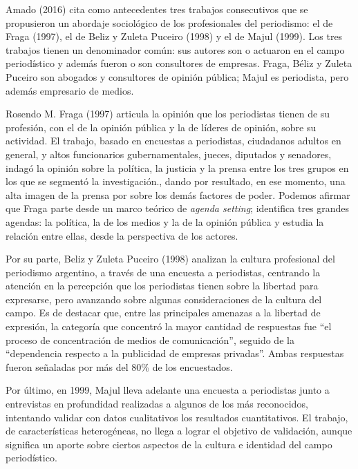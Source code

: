 Amado (2016) cita como antecedentes tres trabajos consecutivos que se propusieron un abordaje sociológico de los profesionales del periodismo: el de Fraga (1997), el de Beliz y Zuleta Puceiro (1998) y el de Majul (1999). Los tres trabajos tienen un denominador común: sus autores son o actuaron en el campo periodístico y además fueron o son consultores de empresas. Fraga, Béliz y Zuleta Puceiro son abogados y consultores de opinión pública; Majul es periodista, pero además empresario de medios.

Rosendo M. Fraga (1997) articula la opinión que los periodistas tienen de su profesión, con el de la opinión pública y la de líderes de opinión, sobre su actividad. El trabajo, basado en encuestas a periodistas, ciudadanos adultos en general, y altos funcionarios gubernamentales, jueces, diputados y senadores, indagó la opinión sobre la política, la justicia y la prensa entre los tres grupos en los que se segmentó la investigación., dando por resultado, en ese momento, una alta imagen de la prensa por sobre los demás factores de poder. Podemos afirmar que Fraga parte desde un marco teórico de \emph{agenda setting}; identifica tres grandes agendas: la política, la de los medios y la de la opinión pública y estudia la relación entre ellas, desde la perspectiva de los actores.

Por su parte, Beliz y Zuleta Puceiro (1998) analizan la cultura profesional del periodismo argentino, a través de una encuesta a periodistas, centrando la atención en la percepción que los periodistas tienen sobre la libertad para expresarse, pero avanzando sobre algunas consideraciones de la cultura del campo. Es de destacar que, entre las principales amenazas a la libertad de expresión, la categoría que concentró la mayor cantidad de respuestas fue \enquote{el proceso de concentración de medios de comunicación}, seguido de la \enquote{dependencia respecto a la publicidad de empresas privadas}. Ambas respuestas fueron señaladas por más del 80\% de los encuestados.

Por último, en 1999, Majul lleva adelante una encuesta a periodistas junto a entrevistas en profundidad realizadas a algunos de los más reconocidos, intentando validar con datos cualitativos los resultados cuantitativos. El trabajo, de características heterogéneas, no llega a lograr el objetivo de validación, aunque significa un aporte sobre ciertos aspectos de la cultura e identidad del campo periodístico.

